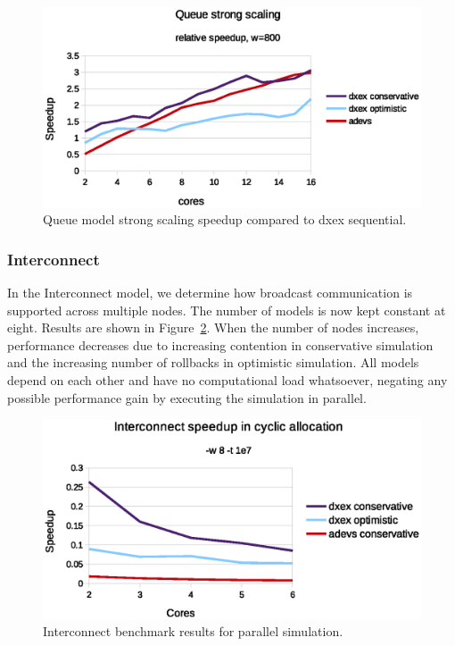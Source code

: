 \begin{figure}
	\center
	\includegraphics[width=\columnwidth]{fig/queue_fixed_strong_speedup.eps}
	\caption{Queue model strong scaling speedup compared to dxex sequential.}
	\label{fig:Queue_plot_strong}
\end{figure}

\subsubsection{Interconnect}\label{subsec:parallelinterconnect}
In the Interconnect model, we determine how broadcast communication is supported across multiple nodes.
The number of models is now kept constant at eight.
Results are shown in Figure~\ref{fig:interconnect_benchmark_parallel}.
When the number of nodes increases, performance decreases due to increasing contention in conservative simulation and the increasing number of rollbacks in optimistic simulation.
All models depend on each other and have no computational load whatsoever, negating any possible performance gain by executing the simulation in parallel.

\begin{figure}
	\center
	\includegraphics[width=\columnwidth]{fig/interconnect_parallel.eps}
	\caption{Interconnect benchmark results for parallel simulation.}
	\label{fig:interconnect_benchmark_parallel}
\end{figure}

